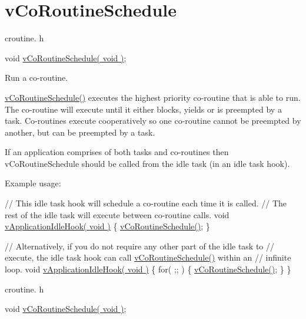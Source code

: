 \hypertarget{group__v_co_routine_schedule}{}\section{v\+Co\+Routine\+Schedule}
\label{group__v_co_routine_schedule}
croutine. h 
\begin{DoxyPre}
void \hyperlink{externals_2freertos_2include_2croutine_8h_a5333c649a2c063006ca3cd7a3b5b9240}{vCoRoutineSchedule( void )};
\end{DoxyPre}


Run a co-\/routine.

\hyperlink{externals_2freertos_2include_2croutine_8h_a5333c649a2c063006ca3cd7a3b5b9240}{v\+Co\+Routine\+Schedule()} executes the highest priority co-\/routine that is able to run. The co-\/routine will execute until it either blocks, yields or is preempted by a task. Co-\/routines execute cooperatively so one co-\/routine cannot be preempted by another, but can be preempted by a task.

If an application comprises of both tasks and co-\/routines then v\+Co\+Routine\+Schedule should be called from the idle task (in an idle task hook).

Example usage\+: 
\begin{DoxyPre}
// This idle task hook will schedule a co-routine each time it is called.
// The rest of the idle task will execute between co-routine calls.
void \hyperlink{support_8c_a97fd430f36f8b065226e2bff9bad1de5}{vApplicationIdleHook( void )}
\{
 \hyperlink{externals_2freertos_2include_2croutine_8h_a5333c649a2c063006ca3cd7a3b5b9240}{vCoRoutineSchedule()};
\}\end{DoxyPre}



\begin{DoxyPre}// Alternatively, if you do not require any other part of the idle task to
// execute, the idle task hook can call \hyperlink{externals_2freertos_2include_2croutine_8h_a5333c649a2c063006ca3cd7a3b5b9240}{vCoRoutineSchedule()} within an
// infinite loop.
void \hyperlink{support_8c_a97fd430f36f8b065226e2bff9bad1de5}{vApplicationIdleHook( void )}
\{
 for( ;; )
 \{
     \hyperlink{externals_2freertos_2include_2croutine_8h_a5333c649a2c063006ca3cd7a3b5b9240}{vCoRoutineSchedule()};
 \}
\}
\end{DoxyPre}


croutine. h 
\begin{DoxyPre}
void \hyperlink{externals_2freertos_2include_2croutine_8h_a5333c649a2c063006ca3cd7a3b5b9240}{vCoRoutineSchedule( void )};\end{DoxyPre}



